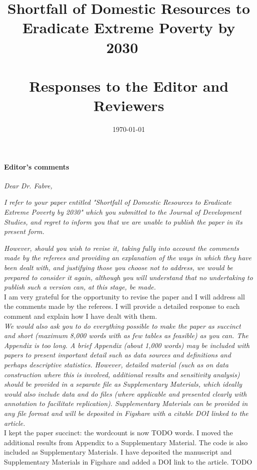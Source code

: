 \documentclass[12pt,english]{article}
\title{Shortfall of Domestic Resources to Eradicate Extreme Poverty by 2030 ~\\ ~\\ \textbf{Responses to the Editor and Reviewers}}
\date{\today}
\begin{document}
	
\maketitle

\paragraph*{Editor's comments}

\textit{Dear Dr. Fabre,}

\textit{I refer to your paper entitled  "Shortfall of Domestic Resources to Eradicate Extreme Poverty by 2030" which you submitted to the Journal of Development Studies, and regret to inform you that we are unable to publish the paper in its present form.}

\textit{However, should you wish to revise it, taking fully into account the comments made by the referees and providing an explanation of the ways in which they have been dealt with, and justifying those you choose not to address, we would be prepared to consider it again, although you will understand that no undertaking to publish such a version can, at this stage, be made.}~\\

I am very grateful for the opportunity to revise the paper and I will address all the comments made by the referees. I will provide a detailed response to each comment and explain how I have dealt with them. ~\\

\textit{We would also ask you to do everything possible to make the paper as succinct and short (maximum 8,000 words with as few tables as feasible) as you can. The Appendix is too long.  A brief Appendix (about 1,000 words) may be included with papers to present important detail such as data sources and definitions and perhaps descriptive statistics.  %
However, detailed material (such as on data construction where this is involved, additional results and sensitivity analysis) should be provided in a separate file as Supplementary Materials, which ideally would also include data and do files (where applicable and presented clearly with annotation to facilitate replication). Supplementary Materials can be provided in any file format and will be deposited in Figshare with a citable DOI linked to the article.}~\\

I kept the paper succinct: the wordcount is now TODO words. I moved the additional results from Appendix to a Supplementary Material. The code is also included as Supplementary Materials. I have deposited the manuscript and Supplementary Materials in Figshare and added a DOI link to the article. TODO 
~\\ ~\\
\end{document}

